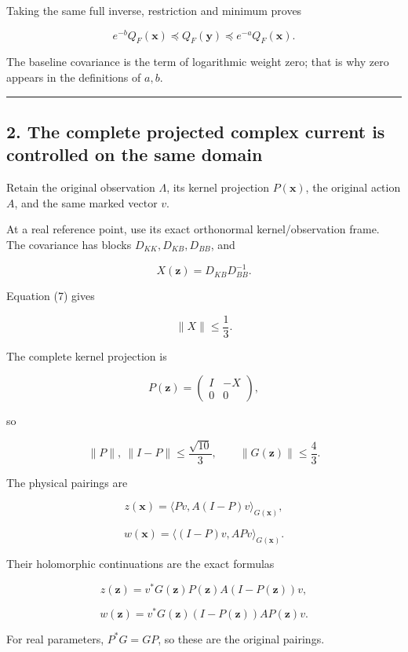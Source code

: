 \documentclass[11pt]{article}
\begin{document}
Taking the same full inverse, restriction and minimum proves

\[
\boxed{
e^{-b}Q_F(\mathbf x)
\preceq Q_F(\mathbf y)
\preceq e^{-a}Q_F(\mathbf x).
}
\tag{12}
\]

The baseline covariance is the term of logarithmic weight zero; that is why zero appears in the definitions of \(a,b\).

\begin{center}\rule{0.5\linewidth}{0.5pt}\end{center}

\subsection{2. The complete projected complex current is controlled on the same domain}\label{the-complete-projected-complex-current-is-controlled-on-the-same-domain}

Retain the original observation \(\Lambda\), its kernel projection \(P(\mathbf x)\), the original action \(A\), and the same marked vector \(v\).

At a real reference point, use its exact orthonormal kernel/observation frame. The covariance has blocks \(D_{KK},D_{KB},D_{BB}\), and

\[
X(\mathbf z)=D_{KB}D_{BB}^{-1}.
\]

Equation (7) gives

\[
\|X\|\le\frac13.
\]

The complete kernel projection is

\[
P(\mathbf z)=
\begin{pmatrix}I&-X\\0&0\end{pmatrix},
\]

so

\[
\|P\|,\ \|I-P\|\le\frac{\sqrt{10}}3,
\qquad
\|G(\mathbf z)\|\le\frac43.
\tag{13}
\]

The physical pairings are

\[
z(\mathbf x)
=
\langle Pv,A(I-P)v\rangle_{G(\mathbf x)},
\]

\[
w(\mathbf x)
=
\langle(I-P)v,APv\rangle_{G(\mathbf x)}.
\]

Their holomorphic continuations are the exact formulas

\[
z(\mathbf z)=v^*G(\mathbf z)P(\mathbf z)A(I-P(\mathbf z))v,
\]

\[
w(\mathbf z)=v^*G(\mathbf z)(I-P(\mathbf z))AP(\mathbf z)v.
\tag{14}
\]

For real parameters, \(P^*G=GP\), so these are the original pairings.
\end{document}
